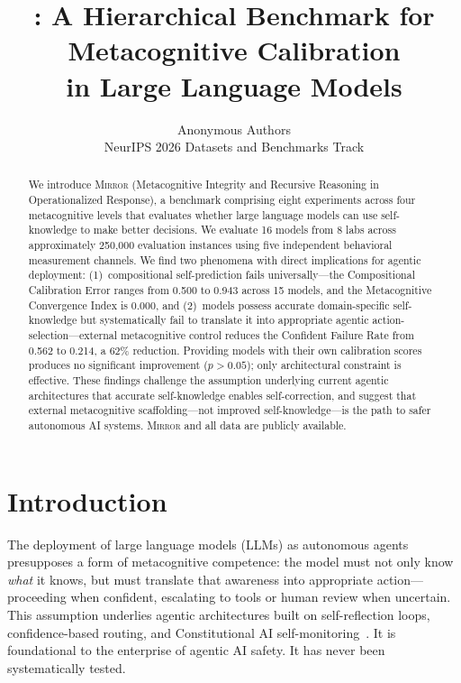 \documentclass[10pt]{article}
\title{\mirror{}: A Hierarchical Benchmark for Metacognitive Calibration\\in Large Language Models}
\author{
  Anonymous Authors \\
  NeurIPS 2026 Datasets and Benchmarks Track
}
\date{}
\newcommand{\mirror}{\textsc{Mirror}}
\begin{document}
\maketitle

\begin{abstract}
We introduce \mirror{} (Metacognitive Integrity and Recursive Reasoning in
Operationalized Response), a benchmark comprising eight experiments across four
metacognitive levels that evaluates whether large language models can use
self-knowledge to make better decisions. We evaluate 16 models from 8 labs across
approximately 250,000 evaluation instances using five independent behavioral
measurement channels. We find two phenomena with direct implications for agentic
deployment: (1)~compositional self-prediction fails universally---the Compositional
Calibration Error ranges from 0.500 to 0.943 across 15 models, and the
Metacognitive Convergence Index is 0.000, and (2)~models
possess accurate domain-specific self-knowledge but systematically fail to translate
it into appropriate agentic action-selection---external metacognitive control reduces
the Confident Failure Rate from 0.562 to 0.214, a 62\% reduction. Providing models
with their own calibration scores produces no significant improvement ($p > 0.05$);
only architectural constraint is effective. These findings challenge the assumption
underlying current agentic architectures that accurate self-knowledge enables
self-correction, and suggest that external metacognitive scaffolding---not improved
self-knowledge---is the path to safer autonomous AI systems. \mirror{} and all data
are publicly available.
\end{abstract}

\section{Introduction}
\label{sec:intro}

The deployment of large language models (LLMs) as autonomous agents presupposes a
form of metacognitive competence: the model must not only know \textit{what} it
knows, but must translate that awareness into appropriate action---proceeding when
confident, escalating to tools or human review when uncertain. This assumption
underlies agentic architectures built on self-reflection loops, confidence-based
routing, and Constitutional AI self-monitoring~\citep{perez2022sycophancy}. It is
foundational to the enterprise of agentic AI safety. It has never been
systematically tested.
\end{document}
